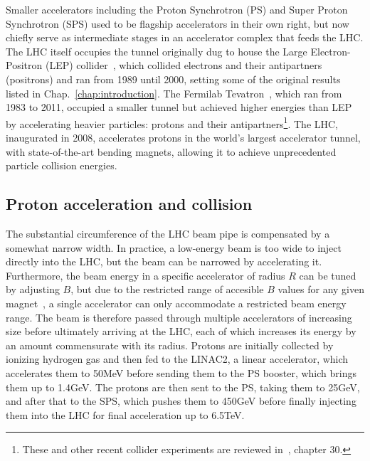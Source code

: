 \documentclass[oneside, letterpaper, 12pt, oldfontcommands]{memoir}
\begin{document}
Smaller accelerators including the Proton Synchrotron (PS) and Super Proton Synchrotron (SPS) used to be flagship accelerators
in their own right, but now chiefly serve as intermediate stages in an accelerator complex that feeds the LHC.
The LHC itself occupies the tunnel originally dug to house the Large Electron-Positron (LEP) collider~\cite{ref:SchopperLEP}, which collided
electrons and their antipartners (positrons) and ran from 1989 until 2000, setting some of the original results
listed in Chap.~\ref{chap:introduction}. The Fermilab Tevatron~\cite{ref:TevatronPhysics}, which ran from 1983 to 2011, occupied a smaller tunnel
but achieved higher energies than LEP by accelerating heavier particles: protons and their antipartners\footnote{These and other recent collider
experiments are reviewed in~\cite{ref:PDG}, chapter 30.}. The LHC, inaugurated in 2008,
accelerates protons in the world's largest accelerator tunnel, with state-of-the-art bending
magnets, allowing it to achieve unprecedented particle collision energies.

\subsection{Proton acceleration and collision} \label{sec:LHCCMS_LHC_proton_acceleration}
The substantial circumference of the LHC beam pipe is compensated by a somewhat narrow width. In practice, a low-energy beam is too wide
to inject directly into the LHC, but the beam can be narrowed by accelerating it.
Furthermore, the beam energy in a specific accelerator of radius $R$ can be tuned by adjusting $B$, but due to the restricted range of
accesible $B$ values for any given magnet~\cite{ref:WilleAccelerators}, a single accelerator can only accommodate a restricted beam energy range.
The beam is therefore passed through multiple accelerators of increasing size before ultimately arriving at the LHC, each of which
increases its energy by an amount commensurate with its radius.
Protons are initially collected by ionizing hydrogen gas and then fed to the LINAC2, a linear accelerator, which accelerates
them to 50\unit{MeV} before sending them to the PS booster, which brings them up to 1.4\unit{GeV}. The protons are then sent to the PS, taking them to 25\unit{GeV},
and after that to the SPS, which pushes them to 450\unit{GeV} before finally injecting them into the LHC for final acceleration
up to 6.5\unit{TeV}.
\end{document}
